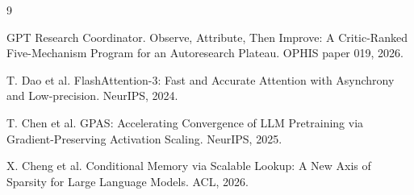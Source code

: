 \documentclass{article}
\begin{document}
{\footnotesize
\begin{thebibliography}{9}

GPT Research Coordinator.
Observe, Attribute, Then Improve: A Critic-Ranked Five-Mechanism Program for
an Autoresearch Plateau. OPHIS paper 019, 2026.

T. Dao et al.
FlashAttention-3: Fast and Accurate Attention with Asynchrony and
Low-precision. NeurIPS, 2024.

T. Chen et al.
GPAS: Accelerating Convergence of LLM Pretraining via
Gradient-Preserving Activation Scaling.
NeurIPS, 2025.

X. Cheng et al.
Conditional Memory via Scalable Lookup: A New Axis of Sparsity for Large
Language Models. ACL, 2026.

\end{thebibliography}
}
\end{document}
